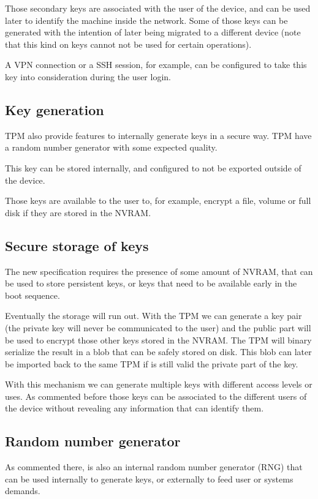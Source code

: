 \documentclass{article}
\begin{document}
Those secondary keys are associated with the user of the device, and
can be used later to identify the machine inside the network.  Some of
those keys can be generated with the intention of later being migrated
to a different device (note that this kind on keys cannot not be used
for certain operations).

A VPN connection or a SSH session, for example, can be configured to
take this key into consideration during the user login.

\subsection{Key generation}
TPM also provide features to internally generate keys in a secure way.
TPM have a random number generator with some expected quality.

This key can be stored internally, and configured to not be exported
outside of the device.

Those keys are available to the user to, for example, encrypt a file,
volume or full disk if they are stored in the NVRAM.

\subsection{Secure storage of keys}
The new specification requires the presence of some amount of NVRAM,
that can be used to store persistent keys, or keys that need to be
available early in the boot sequence.

Eventually the storage will run out.  With the TPM we can generate a
key pair (the private key will never be communicated to the user) and
the public part will be used to encrypt those other keys stored in the
NVRAM.  The TPM will binary serialize the result in a blob that can be
safely stored on disk.  This blob can later be imported back to the
same TPM if is still valid the private part of the key.

With this mechanism we can generate multiple keys with different
access levels or uses.  As commented before those keys can be
associated to the different users of the device without revealing any
information that can identify them.

\subsection{Random number generator}
As commented there, is also an internal random number generator (RNG)
that can be used internally to generate keys, or externally to feed
user or systems demands.
\end{document}
